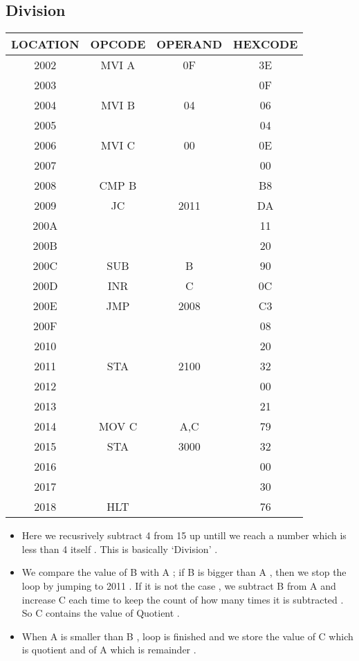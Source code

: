 \documentclass[14pt]{article}
\begin{document}
\subsection{Division}
\begin{center}
\vspace{1em}
\begin{tabular}{ |c|c|c|c| }
	\hline
	\textbf{LOCATION} & \textbf{OPCODE} & \textbf{OPERAND} & \textbf{HEXCODE} \\
	\hline
	2002 & MVI A & 0F & 3E \\
	\hline
	2003 &  &  & 0F \\
	\hline
	2004 & MVI B & 04 & 06 \\
	\hline
	2005 &  &  & 04 \\
	\hline
	2006 & MVI C & 00 & 0E \\
	\hline
	2007 &  &  & 00 \\
	\hline
	2008 & CMP B &  & B8 \\
	\hline
	2009 & JC & 2011 & DA \\
	\hline
	200A &  &  & 11 \\
	\hline
	200B &  &  & 20 \\
	\hline
	200C & SUB & B & 90 \\
	\hline
	200D & INR & C & 0C \\
	\hline
	200E & JMP & 2008 & C3 \\
	\hline
	200F &  &  & 08 \\
	\hline
	2010 &  &  & 20 \\
	\hline
	2011 & STA & 2100 & 32 \\
	\hline
	2012 &  &  & 00 \\
	\hline
	2013 &  &  & 21 \\
	\hline
	2014 & MOV C & A,C & 79 \\
	\hline
	2015 & STA & 3000 & 32 \\
	\hline
	2016 &  &  & 00 \\
	\hline
	2017 &  &  & 30 \\
	\hline
	2018 & HLT &  & 76 \\
	\hline
\end{tabular}
\end{center}
\vspace{1em}
\begin{itemize}
	\item{Here we recusrively subtract 4 from 15 up untill we reach a number which is less than 4 itself . This is basically `Division' .}
	\item{We compare the value of B with A ; if B is bigger than A , then we stop the loop by jumping to 2011 . If it is not the case , we subtract B from A and increase C each time to keep the count of how many times it is subtracted . So C contains the value of Quotient .}
	\item{When A is smaller than B , loop is finished and we store the value of C which is quotient and of A which is remainder .}
\end{itemize}
\end{document}
